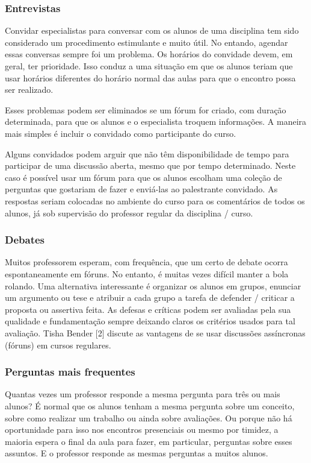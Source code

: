 \subsubsection{Entrevistas}
Convidar especialistas para conversar com os alunos de uma disciplina tem sido considerado  um procedimento estimulante e muito útil. No entando, agendar essas conversas sempre foi um problema. Os horários do convidade devem, em geral, ter prioridade. Isso conduz a uma situação em que os alunos teriam que usar horários diferentes do horário normal das aulas para que o encontro possa ser realizado.

Esses problemas podem ser eliminados se um fórum for criado, com duração determinada, para que os alunos e o especialista troquem informações. A maneira mais simples é incluir o convidado como participante do curso.

Alguns convidados podem arguir que não têm disponibilidade de tempo para participar de uma discussão aberta, mesmo que por tempo determinado. Neste caso é possível usar um fórum para que os alunos escolham uma coleção de perguntas que gostariam de fazer e enviá-las ao palestrante convidado. As respostas seriam colocadas no ambiente do curso para os comentários de todos os alunos, já sob supervisão do professor regular da disciplina / curso.
\subsubsection{Debates}
Muitos professorem esperam, com frequência, que um certo de debate ocorra espontaneamente em fóruns. No entanto, é muitas vezes difícil manter a bola rolando. Uma alternativa interessante é organizar os alunos em grupos, enunciar um argumento ou tese e atribuir a cada grupo a tarefa de defender / criticar a proposta ou assertiva feita. As defesas e críticas podem ser avaliadas pela sua qualidade e fundamentação sempre deixando claros os critérios usados para tal avaliação. Tisha Bender [2] discute as vantagens de se usar discussões assíncronas (fóruns) em cursos regulares.
\subsubsection{Perguntas mais frequentes}
Quantas vezes um professor responde a mesma pergunta para três ou mais alunos? É normal que os alunos tenham a mesma pergunta sobre um conceito, sobre como realizar um trabalho ou ainda sobre avaliações. Ou porque não há oportunidade para isso nos encontros presenciais ou mesmo por timidez, a maioria espera o final da aula para fazer, em particular, perguntas sobre esses assuntos. E o professor responde as mesmas perguntas a muitos alunos.

